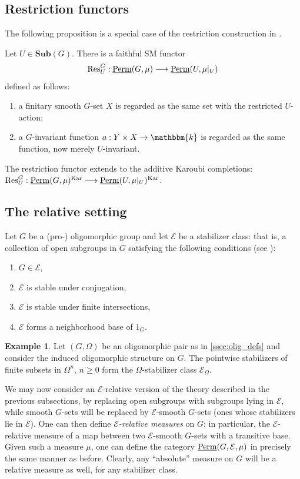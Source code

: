 \documentclass[11pt,a4paper]{amsart}
\theoremstyle{plain}%
\theoremstyle{definition}
\newtheorem{example}[lemma]{Example}
\theoremstyle{remark}
\newcommand{\Res}{\operatorname{Res}}
\newcommand{\Perm}{\underline{{\rm Perm}}}
\newcommand{\kk}{\mathbbm{k}}
\newcommand{\Kar}{\mathrm{Kar}}
\newcommand{\Sub}{\mathbf{Sub}}
\begin{document}
\subsection{Restriction functors}\label{sec:restriction}

The following proposition is a special case of the restriction construction in \cite[Proposition~3.4]{HS-classical}.


Let $U\in \Sub(G)$. There is a faithful SM functor
\[
 \Res_U^G:\Perm(G,\mu)\longrightarrow\Perm(U,\mu|_U)
\]
defined as follows:
\begin{enumerate}[label=\textup{(\roman*)}]
\item a finitary smooth $G$-set $X$ is regarded as the same set with the restricted $U$-action;
\item a $G$-invariant function $a:Y\times X\to\kk$ is regarded as the same function, now merely $U$-invariant.
\end{enumerate}
The restriction functor extends to the additive Karoubi completions: $\Res_U^G:\Perm(G,\mu)^{\Kar}\longrightarrow\Perm(U,\mu|_U)^{\Kar}$.


\subsection{The relative setting}\label{sec:relative}
Let $G$ be a (pro-) oligomorphic group and let $\mathcal{E}$ be a stabilizer class: that is, a collection of open subgroups in $G$ satisfying the following conditions (see \cite[Section 2.6]{HS-oligomorphic}):
\begin{enumerate}
    \item $G\in \mathcal{E}$,
    \item $\mathcal{E}$ is stable under conjugation,
    \item $\mathcal{E}$ is stable under finite intersections,
    \item $\mathcal{E}$ forms a neighborhood base of $1_G$.
\end{enumerate}

\begin{example}\label{ex:Omega_stabilizer_class}
    Let $(G, \Omega)$ be an oligomorphic pair as in \cref{ssec:olig_defs} and consider the induced oligomorphic structure on $G$. The pointwise stabilizers of finite subsets in $\Omega^n$, $n\geq 0$ form the $\Omega$-stabilizer class $\mathcal{E}_{\Omega}$.
\end{example}

We may now consider {an} $\mathcal{E}$-relative version of the theory described in the previous subsections, by replacing open subgroups with subgroups lying in $\mathcal{E}$, while smooth $G$-sets will be replaced by $\mathcal{E}$-smooth $G$-sets (ones whose stabilizers lie in $\mathcal{E}$). One can then define \emph{$\mathcal E$-relative measures} on $G$; in particular, the $\mathcal E$-relative measure of a map between two $\mathcal{E}$-smooth $G$-sets with a transitive base. Given such a measure $\mu$, one can define the category $\Perm(G, \mathcal{E}, \mu)$ in precisely the same manner as before. Clearly, any {``}absolute'' measure on $G$ will be a relative measure as well, for any stabilizer class.
\end{document}
